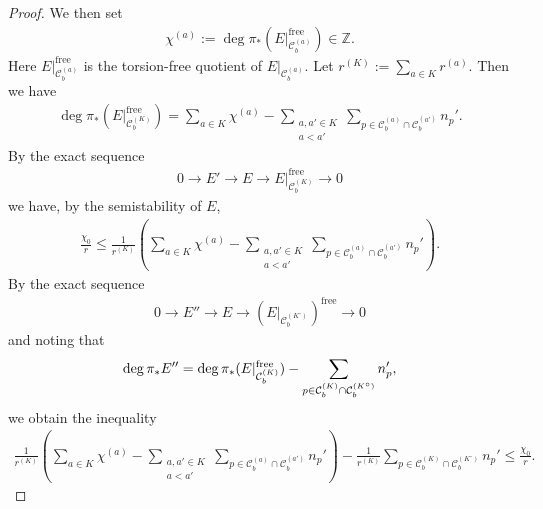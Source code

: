 \documentclass[11pt,oneside,a4paper,mathscr]{amsart}
\theoremstyle{definition}
\renewcommand{\leq}{\leqslant}
\newcommand{\cC}{\mathcal{C}}
\begin{document}
\begin{proof}
We then set 
\begin{align*}
    \chi^{(a)}:=\deg \pi_{*}(E|_{\cC_b^{(a)}}^{\mathrm{free}}) \in \mathbb{Z}. 
\end{align*}
Here $E|_{\cC_b^{(a)}}^{\mathrm{free}}$ is the torsion-free quotient of $E|_{\cC_b^{(a)}}$. 
Let $r^{(K)}:=\sum_{a\in K}r^{(a)}$. 
Then we have 
\begin{align*}
    \deg \pi_{*}(E|_{\cC_b^{(K)}}^{\mathrm{free}})
    =
    \sum_{a\in K} \chi^{(a)} 
    -\sum_{\substack{a,a' \in K\\ a<a'}}
    \sum_{p\in \cC_b^{(a)} \cap \cC_b^{(a')}}n_p'.
\end{align*}
By the exact sequence 
\begin{align*}
    0\to E' \to E \to E|_{\cC_b^{(K)}}^{\mathrm{free}} \to 0
\end{align*}
we have, by the semistability of $E$,
\begin{align}\label{ineq:chi}
    \frac{\chi_0}{r} \leq 
    \frac{1}{r^{(K)}}\left(
    \sum_{a\in K} \chi^{(a)} 
    -\sum_{\substack{a,a' \in K\\ a<a'}}
    \sum_{p\in \cC_b^{(a)} \cap \cC_b^{(a')}}n_p'  
    \right).
\end{align}
By the exact sequence 
\begin{align*}
    0\to E'' \to E \to (E|_{\cC_b^{(K^\circ)}})^{\mathrm{free}} \to 0
\end{align*}
and noting that 
\begin{align}\notag
    \deg \pi_{*}E''
    =
    \deg \pi_{*}(E|_{\cC_b^{(K)}}^{\mathrm{free}})
    -\sum_{p\in \cC_b^{(K)} \cap \cC_b^{(K^{\circ})}}n_p',
\end{align}
we obtain the inequality 
\begin{align}\label{ineq:chi2}
   \frac{1}{r^{(K)}}\left(
   \sum_{a\in K} \chi^{(a)} 
   -\sum_{\substack{a,a' \in K\\ a<a'}}
   \sum_{p\in \cC_b^{(a)} \cap \cC_b^{(a')}}n_p'  
   \right)
   -\frac{1}{r^{(K)}}\sum_{p\in \cC_b^{(K)} \cap \cC_b^{(K^{\circ})}}n_p'
   \leq \frac{\chi_0}{r}.
\end{align}


\end{proof}
\end{document}
